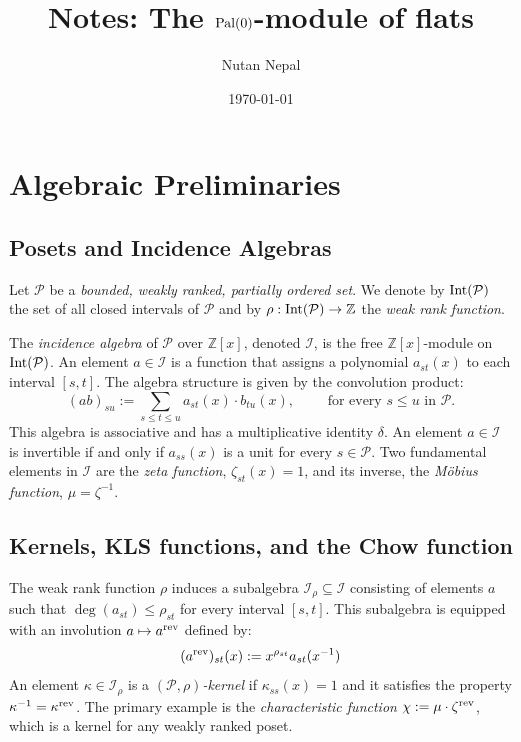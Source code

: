 \documentclass[11pt]{article}
\title{Notes: The $\normalfont\text{Pal}(0)$-module of flats}
\author{Nutan Nepal}
\date{\today}
\newcommand{\ZZ}{\mathbb{Z}}
\newcommand{\calP}{\mathcal{P}}
\newcommand{\IntP}{\normalfont\text{Int}}
\newcommand{\rev}{\normalfont\text{rev}}
\theoremstyle{remark}
\begin{document}
\maketitle

\section{Algebraic Preliminaries}

\subsection{Posets and Incidence Algebras}
Let \(\calP\) be a \emph{bounded, weakly ranked, partially ordered set}.
We denote by \(\IntP(\calP)\) the set of all closed intervals of \(\calP\) and
by \(\rho: \IntP(\calP) \to \ZZ\)
the \emph{weak rank function}.

The \emph{incidence algebra} of \(\calP\) over \(\ZZ[x]\), denoted \(\mathscr{I}\), is the free \(\ZZ[x]\)-module on \(\IntP(\calP)\). An element \(a \in \mathscr{I}\) is a function that assigns a polynomial \(a_{st}(x)\) to each interval \([s,t]\). The algebra structure is given by the convolution product:
\[ (ab)_{su} := \sum_{s\leq t\leq u} a_{st}(x) \cdot b_{tu}(x), \qquad
    \text{ for every \(s\leq u\) in \(\calP\).}
\]
This algebra is associative and has a multiplicative identity \(\delta\).
An element \(a \in \mathscr{I}\) is invertible if and only if \(a_{ss}(x)\) is a unit
for every \(s \in \calP\). Two fundamental elements in \(\mathscr{I}\) are the \emph{zeta function},
\(\zeta_{st}(x) = 1\), and its inverse, the \emph{Möbius function}, \(\mu = \zeta^{-1}\).

\subsection{Kernels, KLS functions, and the Chow function}
The weak rank function \(\rho\) induces a subalgebra \(\mathscr{I}_\rho \subseteq \mathscr{I}\) consisting of elements \(a\) such that \(\deg(a_{st}) \le \rho_{st}\) for every interval \([s,t]\). This subalgebra is equipped with an involution \(a \mapsto a^{\rev}\) defined by:
\[ (a^{\rev})_{st}(x) := x^{\rho_{st}} a_{st}(x^{-1}) \]
An element \(\kappa \in \mathscr{I}_\rho\) is a \emph{\((\calP,\rho)\)-kernel} if
\(\kappa_{ss}(x) = 1\) and it satisfies the property \(\kappa^{-1} = \kappa^{\rev}\).
The primary example is the \emph{characteristic function} \(\chi := \mu \cdot \zeta^{\rev}\),
which is a kernel for any weakly ranked poset.
\end{document}
